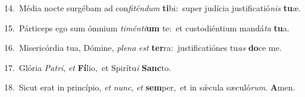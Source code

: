 {\numbfont\textcolor{\numbcolor}{14.}}~Média nocte surgébam ad con\-\textit{fi}\-\textit{tén}\textit{dum} \textbf{ti}\-bi:~\star super judícia justificatió\textit{nis} \textbf{tu}\-æ.\par
{\numbfont\textcolor{\numbcolor}{15.}}~Párticeps ego sum ómnium \textit{ti}\-\textit{mén}\textit{ti}\textbf{um} te:~\star et custodiéntium mandá\textit{ta} \textbf{tu}\-a.\par
{\numbfont\textcolor{\numbcolor}{16.}}~Misericórdia tua, Dómine, \textit{ple}\-\textit{na} \textit{est} \textbf{ter}\-ra:~\star justificatiónes tu\textit{as} \textbf{do}\-ce me.\par
{\numbfont\textcolor{\numbcolor}{17.}}~Glória \textit{Pa}\-\textit{tri}, \textit{et} \textbf{Fí}\-lio,~\star et Spirítu\textit{i} \textbf{Sanc}\-to.\par
{\numbfont\textcolor{\numbcolor}{18.}}~Sicut erat in princípio, \textit{et} \textit{nunc}\-, \textit{et} \textbf{sem}\-per,~\star et in sǽcula sæculó\-\textit{rum}\-. \textbf{A}\-men.\par
